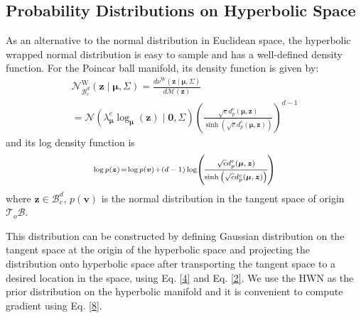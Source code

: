 \documentclass[letterpaper]{article} %
\begin{document}
\subsection{Probability Distributions on Hyperbolic Space}\label{section:4.1}
As an alternative to the normal distribution in Euclidean space, the hyperbolic wrapped normal distribution  \cite{nagano2019wrapped,mathieu2019continuous} is easy to sample and has a well-defined density function. For the Poincar ball manifold, its density function is given by:
\begin{equation}
\begin{array}{l}
\mathcal{N}_{\mathcal{B}_{c}^{d}}^{\mathrm{W}}(\boldsymbol{z} \mid \boldsymbol{\mu}, \Sigma)=\frac{d \nu^{\mathrm{W}}(\boldsymbol{z} \mid \boldsymbol{\mu}, \Sigma)}{d \mathcal{M}(\boldsymbol{z})} \\
=\mathcal{N}\left(\lambda_{\boldsymbol{\mu}}^{c} \log _{\boldsymbol{\mu}}(\boldsymbol{z}) \mid \mathbf{0}, \Sigma\right)\left(\frac{\sqrt{c} d_{p}^{c}(\boldsymbol{\mu}, \boldsymbol{z})}{\sinh \left(\sqrt{c} d_{p}^{c}(\boldsymbol{\mu}, \boldsymbol{z})\right)}\right)^{d-1}
\end{array}
\end{equation}
and its log density function is
\begin{equation}\label{8}
\begin{scriptsize}
\log p(\boldsymbol{z})\!=\!\log p(\boldsymbol{v})\!+\!(d-1)\log\! \left(\!\frac{ \sqrt{c} d_{p}^{c}(\boldsymbol{\mu}, \boldsymbol{z})}{\sinh\left(\sqrt{c} d_{p}^{c}(\boldsymbol{\mu}, \boldsymbol{z})\right)}\!\right)
\end{scriptsize}
\end{equation}
where $\boldsymbol{z}\in \mathcal{B}_{c}^{d}$,
$p(\boldsymbol{v})$ is the normal distribution in the tangent space of origin $\mathcal{T}_{o} \mathcal{B}$.


This distribution can be constructed by defining Gaussian distribution on the tangent space at the origin of the hyperbolic space and projecting the distribution onto hyperbolic space after transporting the tangent space to a desired location in the space, using Eq. \eqref{4} and Eq. \eqref{2}. We use the HWN as the prior distribution on the hyperbolic manifold and it is convenient to compute gradient using Eq. \eqref{8}.
\end{document}
